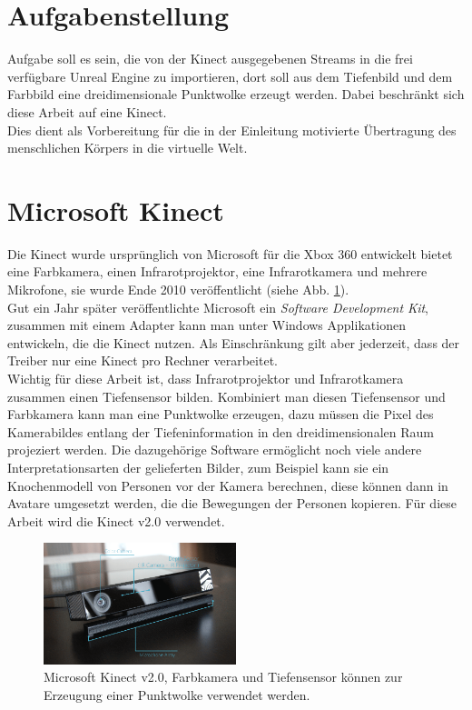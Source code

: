 \documentclass[a4paper]{IEEEtran}
\begin{document}
\section{Aufgabenstellung}
	Aufgabe soll es sein, die von der Kinect ausgegebenen Streams in die frei verfügbare Unreal Engine zu importieren, dort soll aus dem Tiefenbild und dem Farbbild eine dreidimensionale Punktwolke erzeugt werden. 
	Dabei beschränkt sich diese Arbeit auf eine Kinect. \\
	Dies dient als Vorbereitung für die in der Einleitung motivierte Übertragung des menschlichen Körpers in die virtuelle Welt. \\


\section{Microsoft Kinect}
	Die Kinect wurde ursprünglich von Microsoft für die Xbox 360 entwickelt bietet eine Farbkamera, einen Infrarotprojektor, eine Infrarotkamera und mehrere Mikrofone, sie wurde Ende 2010 veröffentlicht (siehe Abb. \ref{Kinectv2}). \\
	Gut ein Jahr später veröffentlichte Microsoft ein \textit{Software Development Kit}, zusammen mit einem Adapter kann man unter Windows Applikationen entwickeln, die die Kinect nutzen.
	Als Einschränkung gilt aber jederzeit, dass der Treiber nur eine Kinect pro Rechner verarbeitet.\\
	Wichtig für diese Arbeit ist, dass Infrarotprojektor und Infrarotkamera zusammen einen Tiefensensor bilden. 
	Kombiniert man diesen Tiefensensor und Farbkamera kann man eine Punktwolke erzeugen, dazu müssen die Pixel des Kamerabildes entlang der Tiefeninformation in den dreidimensionalen Raum projeziert werden. 
	Die dazugehörige Software ermöglicht noch viele andere Interpretationsarten der gelieferten Bilder, zum Beispiel kann sie ein Knochenmodell von Personen vor der Kamera berechnen, diese können dann in Avatare umgesetzt werden, die die Bewegungen der Personen kopieren.
	Für diese Arbeit wird die Kinect v2.0 verwendet. \\[0.5cm]
	
	\begin{figure}[!h]
    	\centering
		\includegraphics[width=0.5\textwidth]{img/Kinectv2}
	    \caption{Microsoft Kinect v2.0, Farbkamera und Tiefensensor können zur Erzeugung einer Punktwolke verwendet werden. {\cite{kinectpic}}}
    	\label{Kinectv2}
	\end{figure}
	
\end{document}
